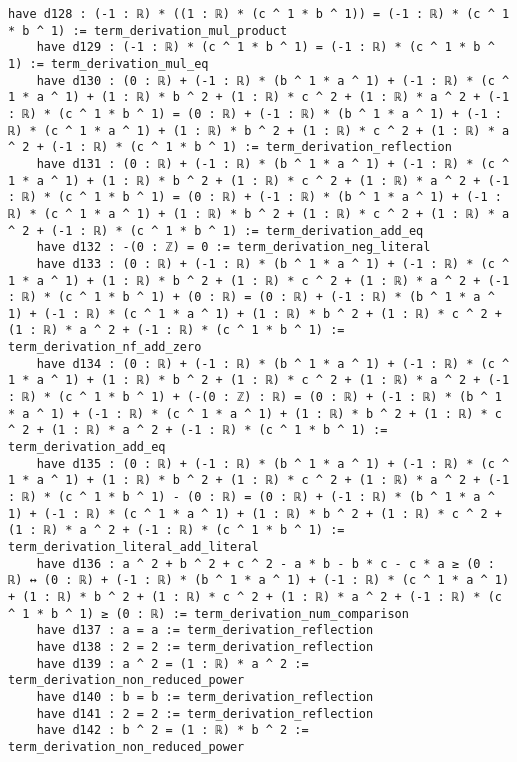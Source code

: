 \documentclass{article}
\begin{document}
\begin{tcolorbox}[colback=white!10, width=\linewidth]
\begin{lstlisting}[language=Lean4]
    have d128 : (-1 : ℝ) * ((1 : ℝ) * (c ^ 1 * b ^ 1)) = (-1 : ℝ) * (c ^ 1 * b ^ 1) := term_derivation_mul_product
    have d129 : (-1 : ℝ) * (c ^ 1 * b ^ 1) = (-1 : ℝ) * (c ^ 1 * b ^ 1) := term_derivation_mul_eq
    have d130 : (0 : ℝ) + (-1 : ℝ) * (b ^ 1 * a ^ 1) + (-1 : ℝ) * (c ^ 1 * a ^ 1) + (1 : ℝ) * b ^ 2 + (1 : ℝ) * c ^ 2 + (1 : ℝ) * a ^ 2 + (-1 : ℝ) * (c ^ 1 * b ^ 1) = (0 : ℝ) + (-1 : ℝ) * (b ^ 1 * a ^ 1) + (-1 : ℝ) * (c ^ 1 * a ^ 1) + (1 : ℝ) * b ^ 2 + (1 : ℝ) * c ^ 2 + (1 : ℝ) * a ^ 2 + (-1 : ℝ) * (c ^ 1 * b ^ 1) := term_derivation_reflection
    have d131 : (0 : ℝ) + (-1 : ℝ) * (b ^ 1 * a ^ 1) + (-1 : ℝ) * (c ^ 1 * a ^ 1) + (1 : ℝ) * b ^ 2 + (1 : ℝ) * c ^ 2 + (1 : ℝ) * a ^ 2 + (-1 : ℝ) * (c ^ 1 * b ^ 1) = (0 : ℝ) + (-1 : ℝ) * (b ^ 1 * a ^ 1) + (-1 : ℝ) * (c ^ 1 * a ^ 1) + (1 : ℝ) * b ^ 2 + (1 : ℝ) * c ^ 2 + (1 : ℝ) * a ^ 2 + (-1 : ℝ) * (c ^ 1 * b ^ 1) := term_derivation_add_eq
    have d132 : -(0 : ℤ) = 0 := term_derivation_neg_literal
    have d133 : (0 : ℝ) + (-1 : ℝ) * (b ^ 1 * a ^ 1) + (-1 : ℝ) * (c ^ 1 * a ^ 1) + (1 : ℝ) * b ^ 2 + (1 : ℝ) * c ^ 2 + (1 : ℝ) * a ^ 2 + (-1 : ℝ) * (c ^ 1 * b ^ 1) + (0 : ℝ) = (0 : ℝ) + (-1 : ℝ) * (b ^ 1 * a ^ 1) + (-1 : ℝ) * (c ^ 1 * a ^ 1) + (1 : ℝ) * b ^ 2 + (1 : ℝ) * c ^ 2 + (1 : ℝ) * a ^ 2 + (-1 : ℝ) * (c ^ 1 * b ^ 1) := term_derivation_nf_add_zero
    have d134 : (0 : ℝ) + (-1 : ℝ) * (b ^ 1 * a ^ 1) + (-1 : ℝ) * (c ^ 1 * a ^ 1) + (1 : ℝ) * b ^ 2 + (1 : ℝ) * c ^ 2 + (1 : ℝ) * a ^ 2 + (-1 : ℝ) * (c ^ 1 * b ^ 1) + (-(0 : ℤ) : ℝ) = (0 : ℝ) + (-1 : ℝ) * (b ^ 1 * a ^ 1) + (-1 : ℝ) * (c ^ 1 * a ^ 1) + (1 : ℝ) * b ^ 2 + (1 : ℝ) * c ^ 2 + (1 : ℝ) * a ^ 2 + (-1 : ℝ) * (c ^ 1 * b ^ 1) := term_derivation_add_eq
    have d135 : (0 : ℝ) + (-1 : ℝ) * (b ^ 1 * a ^ 1) + (-1 : ℝ) * (c ^ 1 * a ^ 1) + (1 : ℝ) * b ^ 2 + (1 : ℝ) * c ^ 2 + (1 : ℝ) * a ^ 2 + (-1 : ℝ) * (c ^ 1 * b ^ 1) - (0 : ℝ) = (0 : ℝ) + (-1 : ℝ) * (b ^ 1 * a ^ 1) + (-1 : ℝ) * (c ^ 1 * a ^ 1) + (1 : ℝ) * b ^ 2 + (1 : ℝ) * c ^ 2 + (1 : ℝ) * a ^ 2 + (-1 : ℝ) * (c ^ 1 * b ^ 1) := term_derivation_literal_add_literal
    have d136 : a ^ 2 + b ^ 2 + c ^ 2 - a * b - b * c - c * a ≥ (0 : ℝ) ↔ (0 : ℝ) + (-1 : ℝ) * (b ^ 1 * a ^ 1) + (-1 : ℝ) * (c ^ 1 * a ^ 1) + (1 : ℝ) * b ^ 2 + (1 : ℝ) * c ^ 2 + (1 : ℝ) * a ^ 2 + (-1 : ℝ) * (c ^ 1 * b ^ 1) ≥ (0 : ℝ) := term_derivation_num_comparison
    have d137 : a = a := term_derivation_reflection
    have d138 : 2 = 2 := term_derivation_reflection
    have d139 : a ^ 2 = (1 : ℝ) * a ^ 2 := term_derivation_non_reduced_power
    have d140 : b = b := term_derivation_reflection
    have d141 : 2 = 2 := term_derivation_reflection
    have d142 : b ^ 2 = (1 : ℝ) * b ^ 2 := term_derivation_non_reduced_power

\end{lstlisting}
\end{tcolorbox}
\end{document}

